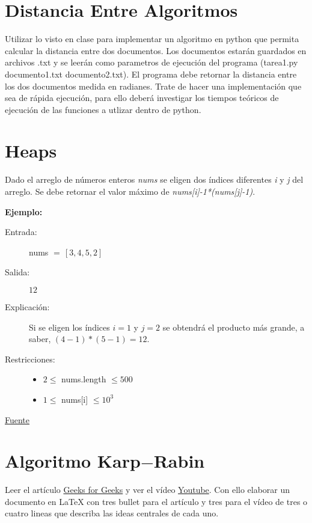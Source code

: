 

\section{Distancia Entre Algoritmos}
Utilizar lo visto en clase para implementar un algoritmo en python que permita calcular la distancia entre dos documentos. Los documentos estarán guardados en archivos .txt y se leerán como parametros de ejecución del programa (tarea1.py documento1.txt documento2.txt). El programa debe retornar la distancia entre los dos documentos medida en radianes. Trate de hacer una implementación que sea de rápida ejecución, para ello deberá investigar los tiempos teóricos de ejecución de las funciones a utlizar dentro de python.

\section{Heaps}
Dado el arreglo de números enteros \textit{nums} se eligen dos índices diferentes \textit{i} y \textit{j} del arreglo. Se debe retornar el valor máximo de \textit{nums[i]-1*(nums[j]-1)}.

\textbf{Ejemplo:}

\begin{description}
	\item[Entrada: ] nums $=\, [3,4,5,2]$
	\item[Salida: ] $12$
	\item[Explicación: ] Si se eligen los índices $i=1$ y $j=2$ se obtendrá el producto más grande, a saber, $(4-1)*(5-1)=12$.
	\item[Restricciones: ]
	\begin{itemize}
		\item $2\leq$ nums.length $\leq 500$
		\item $1\leq $ nums[i] $\leq 10^3$
	\end{itemize}
\end{description}
\href{https://leetcode.com/problems/maximum-product-of-two-elements-in-an-array/discuss/?currentPage=1&orderBy=hot&query=}{Fuente}
%	


\section{Algoritmo Karp$-$Rabin}

Leer el artículo \href{https://www.geeksforgeeks.org/rabin-karp-algorithm-for-pattern-searching/}{Geeks for Geeks} y ver el vídeo \href{https://www.youtube.com/watch?v=qQ8vS2btsxI}{Youtube}. Con ello elaborar un documento en LaTeX con tres bullet para el artículo y tres para el vídeo de tres o cuatro lineas que describa las ideas centrales de cada uno.

